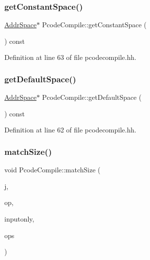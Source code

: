 \subsubsection{\texorpdfstring{getConstantSpace()}{getConstantSpace()}}
{\footnotesize\ttfamily \mbox{\hyperlink{class_addr_space}{Addr\+Space}}$\ast$ Pcode\+Compile\+::get\+Constant\+Space (\begin{DoxyParamCaption}\item[{void}]{ }\end{DoxyParamCaption}) const\hspace{0.3cm}{\ttfamily [inline]}}



Definition at line 63 of file pcodecompile.\+hh.

\mbox{\label{class_pcode_compile_ac881af99317cc5deeea0a581c3915248}} 
\subsubsection{\texorpdfstring{getDefaultSpace()}{getDefaultSpace()}}
{\footnotesize\ttfamily \mbox{\hyperlink{class_addr_space}{Addr\+Space}}$\ast$ Pcode\+Compile\+::get\+Default\+Space (\begin{DoxyParamCaption}\item[{void}]{ }\end{DoxyParamCaption}) const\hspace{0.3cm}{\ttfamily [inline]}}



Definition at line 62 of file pcodecompile.\+hh.

\mbox{\label{class_pcode_compile_afe5eba410aa5edfb8ba083cc3f31da2b}} 
\subsubsection{\texorpdfstring{matchSize()}{matchSize()}}
{\footnotesize\ttfamily void Pcode\+Compile\+::match\+Size (\begin{DoxyParamCaption}\item[{int4}]{j,  }\item[{\mbox{\hyperlink{class_op_tpl}{Op\+Tpl}} $\ast$}]{op,  }\item[{bool}]{inputonly,  }\item[{const vector$<$ \mbox{\hyperlink{class_op_tpl}{Op\+Tpl}} $\ast$ $>$ \&}]{ops }\end{DoxyParamCaption})\hspace{0.3cm}{\ttfamily [static]}}




